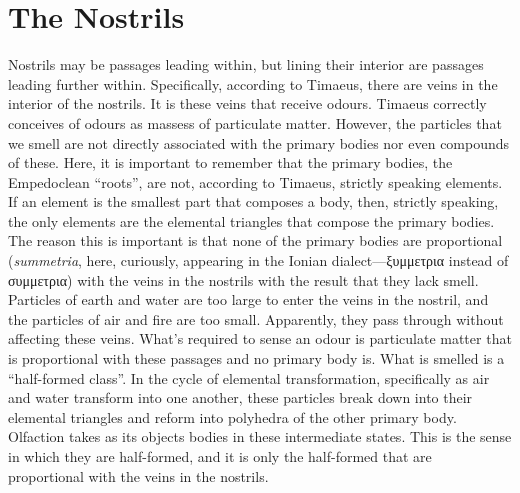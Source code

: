 
\section{The Nostrils} %
\label{sec:the_nostrils}

Nostrils may be passages leading within, but lining their interior are passages leading further within. Specifically, according to Timaeus, there are veins in the interior of the nostrils. It is these veins that receive odours. Timaeus correctly conceives of odours as massess of particulate matter. However, the particles that we smell are not directly associated with the primary bodies nor even compounds of these. Here, it is important to remember that the primary bodies, the Empedoclean ``roots'', are not, according to Timaeus, strictly speaking elements. If an element is the smallest part that composes a body, then, strictly speaking, the only elements are the elemental triangles that compose the primary bodies. The reason this is important is that none of the primary bodies are proportional (\emph{summetria}, here, curiously, appearing in the Ionian dialect---{\sbl ξυμμετρια} instead of {\sbl συμμετρια}) with the veins in the nostrils with the result that they lack smell. Particles of earth and water are too large to enter the veins in the nostril, and the particles of air and fire are too small. Apparently, they pass through without affecting these veins. What's required to sense an odour is particulate matter that is proportional with these passages and no primary body is. What is smelled is a ``half-formed class''. In the cycle of elemental transformation, specifically as air and water transform into one another, these particles break down into their elemental triangles and reform into polyhedra of the other primary body. Olfaction takes as its objects bodies in these intermediate states. This is the sense in which they are half-formed, and it is only the half-formed that are proportional with the veins in the nostrils.

